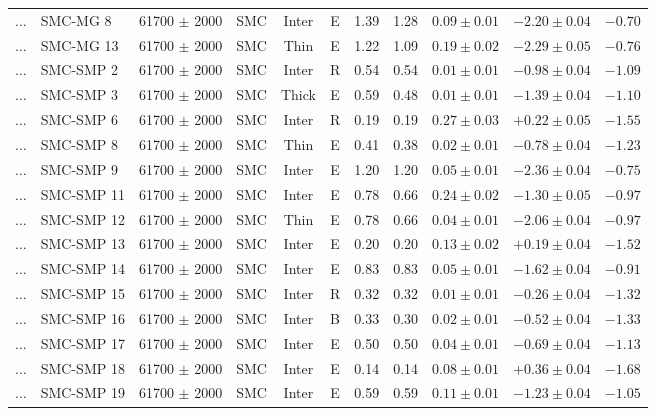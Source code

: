 \documentclass[useAMS]{mn2e}
\begin{document}
\begin{center}
{\begin{longtable}{llccccccccc}
$\ldots$	&	SMC-MG 8	&	61700 $\pm$ 2000	&	SMC	&	Inter	&	E	&	1.39	&	1.28	&	$0.09 \pm  0.01$	&	$-2.20 \pm 0.04$	&	$-0.70$	\\
$\ldots$	&	SMC-MG 13	&	61700 $\pm$ 2000	&	SMC	&	Thin	&	E	&	1.22	&	1.09	&	$0.19 \pm  0.02$	&	$-2.29 \pm 0.05$	&	$-0.76$	\\
$\ldots$	&	SMC-SMP 2	&	61700 $\pm$ 2000	&	SMC	&	Inter	&	R	&	0.54	&	0.54	&	$0.01 \pm  0.01$	&	$-0.98 \pm 0.04$	&	$-1.09$	\\
$\ldots$	&	SMC-SMP 3	&	61700 $\pm$ 2000	&	SMC	&	Thick	&	E	&	0.59	&	0.48	&	$0.01 \pm  0.01$	&	$-1.39 \pm 0.04$	&	$-1.10$	\\
$\ldots$	&	SMC-SMP 6	&	61700 $\pm$ 2000	&	SMC	&	Inter	&	R	&	0.19	&	0.19	&	$0.27 \pm  0.03$	&	$+0.22 \pm 0.05$	&	$-1.55$	\\
$\ldots$	&	SMC-SMP 8	&	61700 $\pm$ 2000	&	SMC	&	Thin	&	E	&	0.41	&	0.38	&	$0.02 \pm  0.01$	&	$-0.78 \pm 0.04$	&	$-1.23$	\\
$\ldots$	&	SMC-SMP 9	&	61700 $\pm$ 2000	&	SMC	&	Inter	&	E	&	1.20	&	1.20	&	$0.05 \pm  0.01$	&	$-2.36 \pm 0.04$	&	$-0.75$	\\
$\ldots$	&	SMC-SMP 11	&	61700 $\pm$ 2000	&	SMC	&	Inter	&	E	&	0.78	&	0.66	&	$0.24 \pm  0.02$	&	$-1.30 \pm 0.05$	&	$-0.97$	\\
$\ldots$	&	SMC-SMP 12	&	61700 $\pm$ 2000	&	SMC	&	Thin	&	E	&	0.78	&	0.66	&	$0.04 \pm  0.01$	&	$-2.06 \pm 0.04$	&	$-0.97$	\\
$\ldots$	&	SMC-SMP 13	&	61700 $\pm$ 2000	&	SMC	&	Inter	&	E	&	0.20	&	0.20	&	$0.13 \pm  0.02$	&	$+0.19 \pm 0.04$	&	$-1.52$	\\
$\ldots$	&	SMC-SMP 14	&	61700 $\pm$ 2000	&	SMC	&	Inter	&	E	&	0.83	&	0.83	&	$0.05 \pm  0.01$	&	$-1.62 \pm 0.04$	&	$-0.91$	\\
$\ldots$	&	SMC-SMP 15	&	61700 $\pm$ 2000	&	SMC	&	Inter	&	R	&	0.32	&	0.32	&	$0.01 \pm  0.01$	&	$-0.26 \pm 0.04$	&	$-1.32$	\\
$\ldots$	&	SMC-SMP 16	&	61700 $\pm$ 2000	&	SMC	&	Inter	&	B	&	0.33	&	0.30	&	$0.02 \pm  0.01$	&	$-0.52 \pm 0.04$	&	$-1.33$	\\
$\ldots$	&	SMC-SMP 17	&	61700 $\pm$ 2000	&	SMC	&	Inter	&	E	&	0.50	&	0.50	&	$0.04 \pm  0.01$	&	$-0.69 \pm 0.04$	&	$-1.13$	\\
$\ldots$	&	SMC-SMP 18	&	61700 $\pm$ 2000	&	SMC	&	Inter	&	E	&	0.14	&	0.14	&	$0.08 \pm  0.01$	&	$+0.36 \pm 0.04$	&	$-1.68$	\\
$\ldots$	&	SMC-SMP 19	&	61700 $\pm$ 2000	&	SMC	&	Inter	&	E	&	0.59	&	0.59	&	$0.11 \pm  0.01$	&	$-1.23 \pm 0.04$	&	$-1.05$	\\

\end{longtable}}
\end{center}
\end{document}
